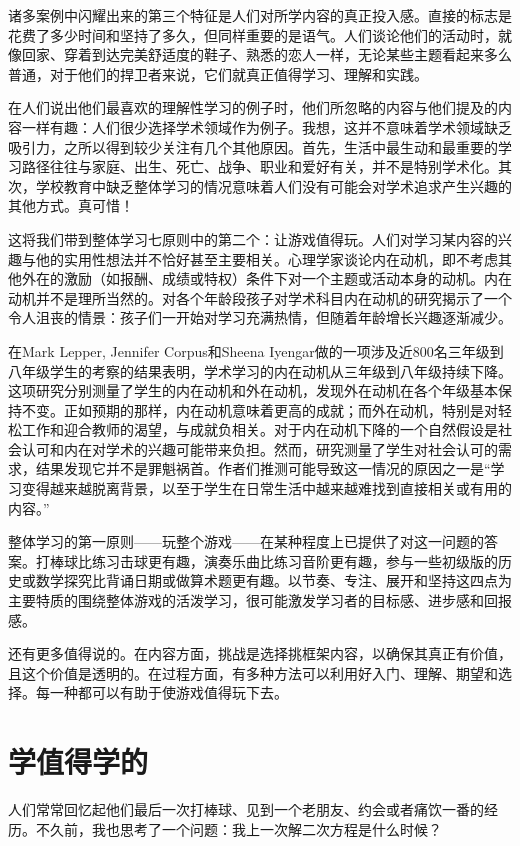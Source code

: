 诸多案例中闪耀出来的第三个特征是人们对所学内容的真正投入感。直接的标志是花费了多少时间和坚持了多久，但同样重要的是语气。人们谈论他们的活动时，就像回家、穿着到达完美舒适度的鞋子、熟悉的恋人一样，无论某些主题看起来多么普通，对于他们的捍卫者来说，它们就真正值得学习、理解和实践。

在人们说出他们最喜欢的理解性学习的例子时，他们所忽略的内容与他们提及的内容一样有趣：人们很少选择学术领域作为例子。我想，这并不意味着学术领域缺乏吸引力，之所以得到较少关注有几个其他原因。首先，生活中最生动和最重要的学习路径往往与家庭、出生、死亡、战争、职业和爱好有关，并不是特别学术化。其次，学校教育中缺乏整体学习的情况意味着人们没有可能会对学术追求产生兴趣的其他方式。真可惜！

这将我们带到整体学习七原则中的第二个：让游戏值得玩。人们对学习某内容的兴趣与他的实用性想法并不恰好甚至主要相关。心理学家谈论内在动机，即不考虑其他外在的激励（如报酬、成绩或特权）条件下对一个主题或活动本身的动机。内在动机并不是理所当然的。对各个年龄段孩子对学术科目内在动机的研究揭示了一个令人沮丧的情景：孩子们一开始对学习充满热情，但随着年龄增长兴趣逐渐减少。

在Mark Lepper, Jennifer Corpus和Sheena Iyengar做的一项涉及近800名三年级到八年级学生的考察的结果表明，学术学习的内在动机从三年级到八年级持续下降。这项研究分别测量了学生的内在动机和外在动机，发现外在动机在各个年级基本保持不变。正如预期的那样，内在动机意味着更高的成就；而外在动机，特别是对轻松工作和迎合教师的渴望，与成就负相关。对于内在动机下降的一个自然假设是社会认可和内在对学术的兴趣可能带来负担。然而，研究测量了学生对社会认可的需求，结果发现它并不是罪魁祸首。作者们推测可能导致这一情况的原因之一是“学习变得越来越脱离背景，以至于学生在日常生活中越来越难找到直接相关或有用的内容。”

整体学习的第一原则——玩整个游戏——在某种程度上已提供了对这一问题的答案。打棒球比练习击球更有趣，演奏乐曲比练习音阶更有趣，参与一些初级版的历史或数学探究比背诵日期或做算术题更有趣。以节奏、专注、展开和坚持这四点为主要特质的围绕整体游戏的活泼学习，很可能激发学习者的目标感、进步感和回报感。

还有更多值得说的。在内容方面，挑战是选择挑框架内容，以确保其真正有价值，且这个价值是透明的。在过程方面，有多种方法可以利用好入门、理解、期望和选择。每一种都可以有助于使游戏值得玩下去。

\section*{学值得学的}

人们常常回忆起他们最后一次打棒球、见到一个老朋友、约会或者痛饮一番的经历。不久前，我也思考了一个问题：我上一次解二次方程是什么时候？

